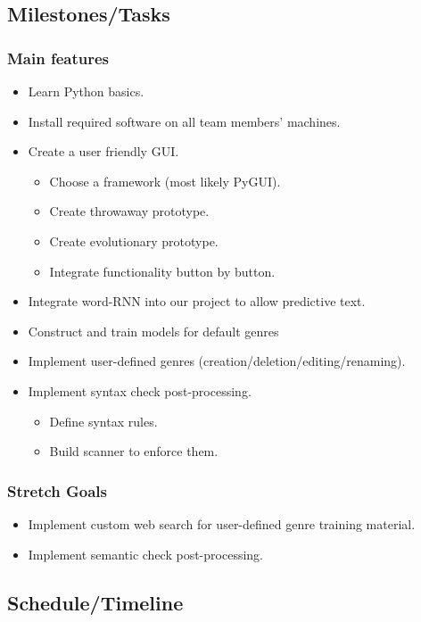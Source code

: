 \documentclass[12pt]{article}
\begin{document}
\subsection{Milestones/Tasks}
\subsubsection{Main features}
\begin{itemize}
\item Learn Python basics.
\item Install required software on all team members' machines.
\item Create a user friendly GUI.
  \begin{itemize}
  \item Choose a framework (most likely PyGUI).
  \item Create throwaway prototype.
  \item Create evolutionary prototype.
  \item Integrate functionality button by button.
  \end{itemize}
\item Integrate word-RNN into our project to allow predictive text.
\item Construct and train models for default genres
\item Implement user-defined genres (creation/deletion/editing/renaming).
\item Implement syntax check post-processing.
\begin{itemize}
\item Define syntax rules.
\item Build scanner to enforce them.
\end{itemize}
\end{itemize}

\subsubsection{Stretch Goals}
\begin{itemize}
\item Implement custom web search for user-defined genre training material.
\item Implement semantic check post-processing.
\end{itemize}


\subsection{Schedule/Timeline}
\end{document}

